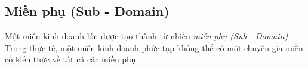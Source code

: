 












\subsection{Miền phụ (Sub - Domain)} \label{subsection:51}

Một miền  kinh doanh   lớn được tạo thành từ nhiều \emph{miền phụ (Sub - Domain)}. Trong thực tế, một miền kinh doanh phức tạp không thể có một chuyên gia  miền    có kiến thức về tất cả các miền phụ.

